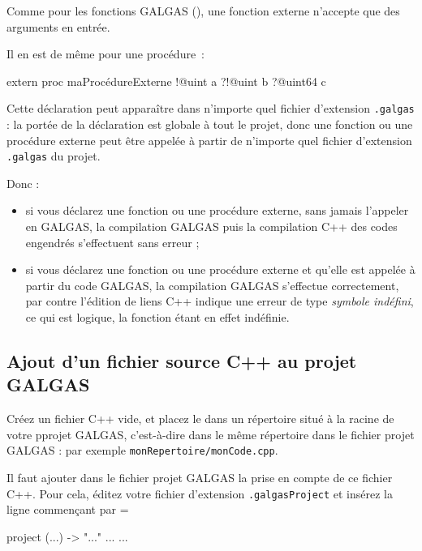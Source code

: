 Comme pour les fonctions GALGAS (), une fonction externe n'accepte que des arguments en entrée.

Il en est de même pour une procédure~:
\begin{galgas}
extern proc maProcédureExterne !@uint a ?!@uint b ?@uint64 c
\end{galgas}

Cette déclaration peut apparaître dans n'importe quel fichier d'extension \texttt{.galgas} : la portée de la déclaration est globale à tout le projet, donc une fonction ou une procédure externe peut être appelée à partir de n'importe quel fichier d'extension \texttt{.galgas} du projet.

Donc : 
\begin{itemize}
  \item si vous déclarez une fonction ou une procédure externe, sans jamais l'appeler en GALGAS, la compilation GALGAS puis la compilation C++ des codes engendrés s'effectuent sans erreur ;
  \item si vous déclarez  une fonction ou une procédure externe et qu'elle est appelée à partir du code GALGAS, la compilation GALGAS s'effectue correctement, par contre l'édition de liens C++ indique une erreur de type \emph{symbole indéfini}, ce qui est logique, la fonction étant en effet indéfinie.
\end{itemize}








\subsection{Ajout d'un fichier source C++ au projet GALGAS}


Créez un fichier C++ vide, et placez le dans un répertoire situé à la racine de votre pprojet GALGAS, c'est-à-dire dans le même répertoire dans le fichier projet GALGAS : par exemple \texttt{monRepertoire/monCode.cpp}.

Il faut ajouter dans le fichier projet GALGAS la prise en compte de ce fichier C++. Pour cela, éditez votre fichier d'extension \texttt{.galgasProject} et insérez la ligne commençant par \ggs=%

\begin{galgas}
project (...) -> "..." {
  ...
  ...
}
\end{galgas}

